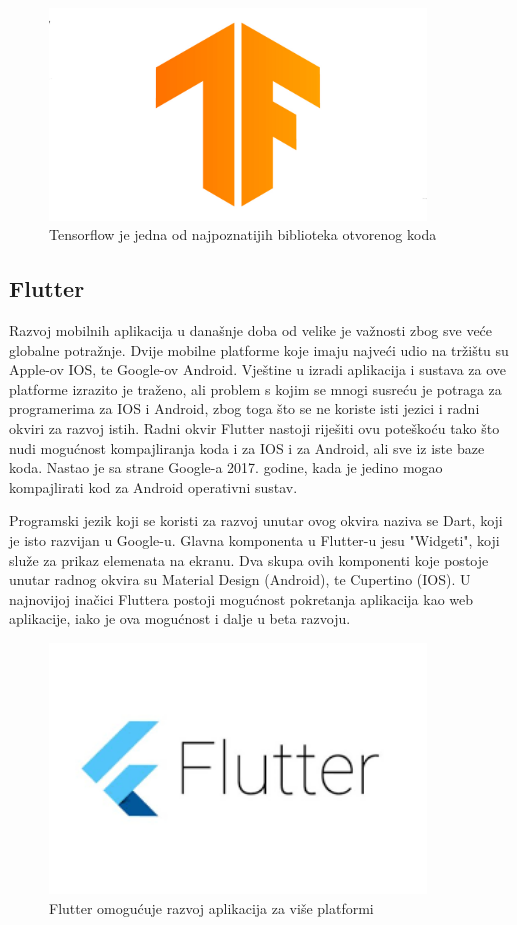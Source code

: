 \begin{figure}[htb]
    \centering
    \includegraphics[width=10cm]{img/tensorflow.png}
    \caption{Tensorflow je jedna od najpoznatijih biblioteka otvorenog koda}
    \label{Tensorflow}
\end{figure}


\subsection{Flutter}
Razvoj mobilnih aplikacija u današnje doba od velike je važnosti zbog sve veće globalne potražnje. Dvije mobilne platforme koje imaju najveći udio na 
tržištu su Apple-ov IOS, te Google-ov Android. Vještine u izradi aplikacija i sustava za ove platforme izrazito je traženo, ali problem s kojim se mnogi
susreću je potraga za programerima za IOS i Android, zbog toga što se ne koriste isti jezici i radni okviri za razvoj istih. 
Radni okvir Flutter nastoji riješiti ovu poteškoću tako što nudi mogućnost kompajliranja koda i za IOS i za Android, ali sve iz iste baze koda. 
Nastao je sa strane Google-a 2017. godine, kada je jedino mogao kompajlirati kod za Android operativni sustav. 

Programski jezik koji se koristi za razvoj unutar ovog okvira naziva se Dart, koji je isto razvijan u Google-u. 
Glavna komponenta u Flutter-u jesu "Widgeti", koji služe za prikaz elemenata na ekranu. Dva skupa ovih komponenti koje postoje unutar radnog 
okvira su Material Design (Android), te Cupertino (IOS).\newline
U najnovijoj inačici Fluttera postoji mogućnost pokretanja aplikacija kao web aplikacije, iako 
je ova mogućnost i dalje u beta razvoju. 

\begin{figure}[htb]
    \centering
    \includegraphics[width=10cm]{img/flutter.png}
    \caption{Flutter omogućuje razvoj aplikacija za više platformi}
    \label{Flutter}
\end{figure}


